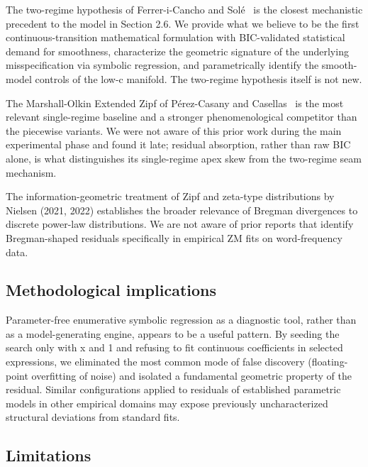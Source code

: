 \documentclass[11pt]{article}
\begin{document}
The two-regime hypothesis of Ferrer-i-Cancho and Solé~\cite{ferrer2001} is the closest mechanistic precedent to the model in Section 2.6. We provide what we believe to be the first continuous-transition mathematical formulation with BIC-validated statistical demand for smoothness, characterize the geometric signature of the underlying misspecification via symbolic regression, and parametrically identify the smooth-model controls of the low-c manifold. The two-regime hypothesis itself is not new.

The Marshall-Olkin Extended Zipf of Pérez-Casany and Casellas~\cite{perez2013} is the most relevant single-regime baseline and a stronger phenomenological competitor than the piecewise variants. We were not aware of this prior work during the main experimental phase and found it late; residual absorption, rather than raw BIC alone, is what distinguishes its single-regime apex skew from the two-regime seam mechanism.

The information-geometric treatment of Zipf and zeta-type distributions by Nielsen (2021, 2022) establishes the broader relevance of Bregman divergences to discrete power-law distributions. We are not aware of prior reports that identify Bregman-shaped residuals specifically in empirical ZM fits on word-frequency data.

\subsection{Methodological implications}

Parameter-free enumerative symbolic regression as a diagnostic tool, rather than as a model-generating engine, appears to be a useful pattern. By seeding the search only with x and 1 and refusing to fit continuous coefficients in selected expressions, we eliminated the most common mode of false discovery (floating-point overfitting of noise) and isolated a fundamental geometric property of the residual. Similar configurations applied to residuals of established parametric models in other empirical domains may expose previously uncharacterized structural deviations from standard fits.

\subsection{Limitations}
\end{document}
